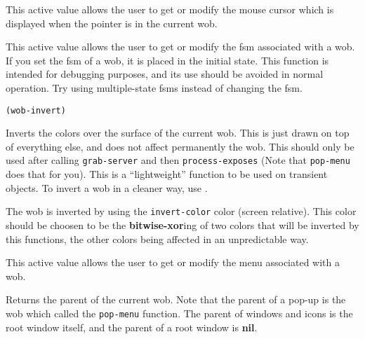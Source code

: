 

This active value allows the user to get or modify the mouse cursor which
is displayed when the pointer is in the current wob.

        

This active value allows the user to get or  modify the fsm associated with
a wob.  If you set the fsm of a wob, it is placed in the initial state.
This function is intended for debugging purposes, and its use should be
avoided in normal operation. Try using multiple-state fsms instead of
changing the fsm.

        
{\usagefont\begin{verbatim}
(wob-invert)
\end{verbatim}}\usageupspace

Inverts the colors over the surface of the
current wob. This is just drawn on top of everything
else, and does not affect permanently the wob. This should only be used after
calling \verb"grab-server" and then \verb"process-exposes"
(Note that \verb"pop-menu" does that for you).
This is a ``lightweight'' function to be used on transient objects.
To invert a wob in a cleaner way, use .

The wob is inverted by using the \verb"invert-color" color (screen relative).
This color should be choosen to be the {\bf bitwise-xor}ing of two colors
that will be inverted by this functions, the other colors being affected
in an unpredictable way.

        

This active value allows the user to get or 
modify the menu associated with a wob.

        

Returns the parent of the current wob.  Note that the parent of a pop-up is
the wob which called the \verb"pop-menu" function. The parent of windows and
icons is the root window itself, and the parent of a root window is {\bf nil}.

